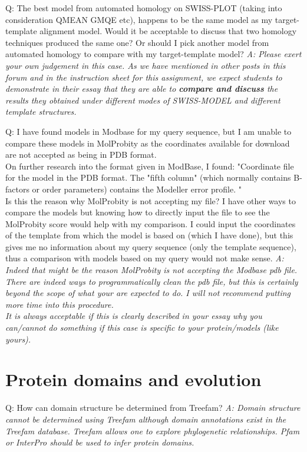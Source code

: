 \documentclass[10pt,a4paper]{article}
\begin{document}
Q: The best model from automated homology on SWISS-PLOT (taking into consideration QMEAN GMQE etc), happens to be the same model as my target-template alignment model. Would it be acceptable to discuss that two homology techniques produced the same one? Or should I pick another model from automated homology to compare with my target-template model? \newline
\textit{A: Please exert your own judgement in this case. As we have mentioned in other posts in this forum and in the instruction sheet for this assignment, we  expect students to demonstrate in their essay that they are able to \textbf{compare and discuss} the results they obtained under different modes of SWISS-MODEL and different template structures.} \newline


Q: I have found models in Modbase for my query sequence, but I am unable to compare these models in MolProbity as the coordinates available for download are not accepted as being in PDB format. \\
On further research into the format given in ModBase, I found:
"Coordinate file for the model in the PDB format. The "fifth column" (which normally contains B-factors or order parameters) contains the Modeller error profile. " \\ 
Is this the reason why MolProbity is not accepting my file? I have other ways to compare the models but knowing how to directly input the file to see the MolProbity score would help with my comparison. I could input the coordinates of the template from which the model is based on (which I have done), but this gives me no information about my query sequence (only the template sequence), thus a comparison with models based on my query would not make sense. \newline
\textit{A: Indeed that might be the reason MolProbity is not accepting the Modbase pdb file. There are indeed ways to programmatically clean the pdb file, but this is certainly beyond the scope of what your are expected to do. I will not recommend putting more time into this procedure. \\ 
It is always acceptable if this is clearly described in your essay why you can/cannot do something if this case is specific to your protein/models (like yours).} \newline


\section{Protein domains and evolution}
Q: How can domain structure be determined from Treefam?  \newline
\textit{A: Domain structure cannot be determined using Treefam although domain annotations exist in the Treefam database. Treefam allows one to explore phylogenetic relationships. Pfam or InterPro should be used to infer protein domains. } \newline
\end{document}
